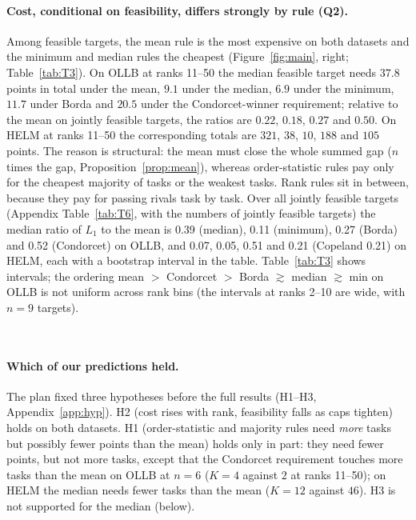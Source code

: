 \documentclass{article}
\begin{document}
\paragraph{Cost, conditional on feasibility, differs strongly by rule (Q2).}
Among feasible targets, the mean rule is the most expensive on both datasets and the minimum and median rules the cheapest (Figure~\ref{fig:main}, right; Table~\ref{tab:T3}). On OLLB at ranks 11--50 the median feasible target needs $37.8$ points in total under the mean, $9.1$ under the median, $6.9$ under the minimum, $11.7$ under Borda and $20.5$ under the Condorcet-winner requirement; relative to the mean on jointly feasible targets, the ratios are $0.22$, $0.18$, $0.27$ and $0.50$. On HELM at ranks 11--50 the corresponding totals are $321$, $38$, $10$, $188$ and $105$ points. The reason is structural: the mean must close the whole summed gap ($n$ times the gap, Proposition~\ref{prop:mean}), whereas order-statistic rules pay only for the cheapest majority of tasks or the weakest tasks. Rank rules sit in between, because they pay for passing rivals task by task. Over all jointly feasible targets (Appendix Table~\ref{tab:T6}, with the numbers of jointly feasible targets) the median ratio of $L_1$ to the mean is 0.39 (median), 0.11 (minimum), 0.27 (Borda) and 0.52 (Condorcet) on OLLB, and 0.07, 0.05, 0.51 and 0.21 (Copeland 0.21) on HELM, each with a bootstrap interval in the table. Table~\ref{tab:T3} shows intervals; the ordering mean $>$ Condorcet $>$ Borda $\gtrsim$ median $\gtrsim$ min on OLLB is not uniform across rank bins (the intervals at ranks 2--10 are wide, with $n=9$ targets).

\begin{table}[t]
\caption{Median investment to become first among feasible targets, by rank stratum and rule, primary caps: OLLB (\texttt{emp99}, top) and HELM (\texttt{emp99T}, bottom). ``feas.'' = feasible targets / targets in the stratum; $K$, $L_1$ with 95\% bootstrap intervals over targets; the last column is the median ratio of $L_1$ to the mean rule over targets feasible under both. OLLB Borda and Condorcet use the 50 best targets only. Generated by \texttt{figures/src/tables.py}.}
\label{tab:T3}
\centering\scriptsize
\resizebox{\linewidth}{!}{}\\[4pt]
\resizebox{\linewidth}{!}{}
\end{table}

\paragraph{Which of our predictions held.}
The plan fixed three hypotheses before the full results (H1--H3, Appendix~\ref{app:hyp}). H2 (cost rises with rank, feasibility falls as caps tighten) holds on both datasets. H1 (order-statistic and majority rules need \emph{more} tasks but possibly fewer points than the mean) holds only in part: they need fewer points, but not more tasks, except that the Condorcet requirement touches more tasks than the mean on OLLB at $n=6$ ($K=4$ against $2$ at ranks 11--50); on HELM the median needs fewer tasks than the mean ($K=12$ against $46$). H3 is not supported for the median (below).
\end{document}

